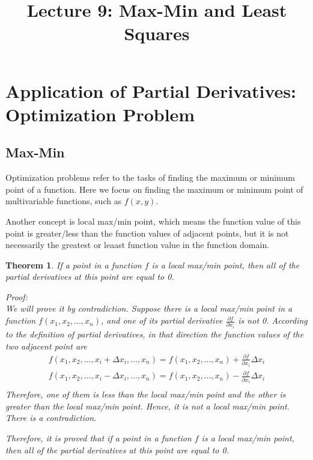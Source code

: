 \documentclass{article}
\title{Lecture 9: Max-Min and Least Squares}
\author{}
\date{}
\newtheorem*{theorem}{Theorem}
\begin{document}
    
\maketitle

\section{Application of Partial Derivatives: Optimization Problem}

\subsection{Max-Min}

Optimization problems refer to the tasks of finding the maximum or minimum point 
of a function. Here we focus on finding the maximum or minimum point of 
multivariable functions, such as $f(x, y)$.

Another concept is local max/min point, which means the function value of this 
point is greater/less than the function values of adjacent points, but it is not 
necessarily the greatest or leaast function value in the function domain.

\begin{theorem}
  If a point in a function $f$ is a local max/min point, then all of the partial 
  derivatives at this point are equal to 0.

  Proof: \\
  We will prove it by contradiction. Suppose there is a local max/min point in a 
  function $f(x_1, x_2, ..., x_n)$, and one of its partial derivative 
  $\frac{\partial f}{\partial x_i}$ is not 0. According to the definition of 
  partial derivatives, in that direction the function values of the two adjacent 
  point are 
  \begin{gather*}
    f(x_1, x_2, ..., x_i + \Delta x_i, ..., x_n) = f(x_1, x_2, ..., x_n) + \frac{\partial f}{\partial x_i} \Delta x_i \\
    f(x_1, x_2, ..., x_i - \Delta x_i, ..., x_n) = f(x_1, x_2, ..., x_n) - \frac{\partial f}{\partial x_i} \Delta x_i \\
  \end{gather*}
  Therefore, one of them is less than the local max/min point and the other is 
  greater than the local max/min point. Hence, it is not a local max/min point.
  There is a contradiction.

  Therefore, it is proved that if a point in a function $f$ is a local max/min 
  point, then all of the partial derivatives at this point are equal to 0.
\end{theorem}
\end{document}
